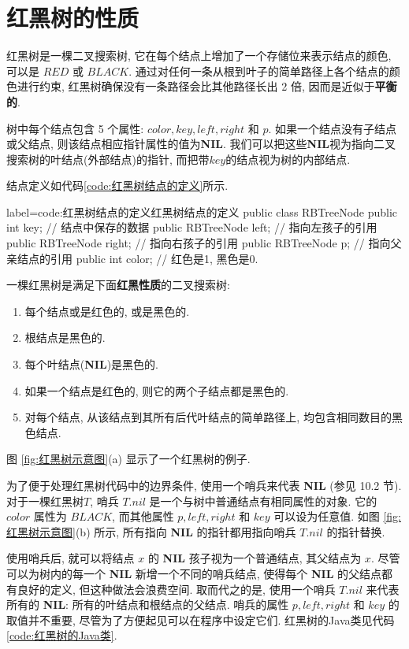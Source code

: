 \documentclass[oneside,10pt,fontset=none]{ctexbook}
\numberwithin{definition}{chapter}
\numberwithin{theorem}{chapter}
\numberwithin{lemma}{chapter}
\begin{document}
\section{红黑树的性质}\label{section:红黑树的性质}

红黑树是一棵二叉搜索树, 它在每个结点上增加了一个存储位来表示结点的颜色, 可以是 $RED$ 或 $BLACK$. 通过对任何一条从根到叶子的简单路径上各个结点的颜色进行约束, 红黑树确保没有一条路径会比其他路径长出 2 倍, 因而是近似于\textbf{平衡的}.

树中每个结点包含 5 个属性: $color, key, left, right$ 和 $p$. 如果一个结点没有子结点或父结点, 则该结点相应指针属性的值为\textbf{NIL}. 我们可以把这些\textbf{NIL}视为指向二叉搜索树的叶结点(外部结点)的指针, 而把带$key$的结点视为树的内部结点.

结点定义如代码\ref{code:红黑树结点的定义}所示.

\begin{myjava}{label={code:红黑树结点的定义}}{红黑树结点的定义}{}
public class RBTreeNode {
    public int key; // 结点中保存的数据
    public RBTreeNode left; // 指向左孩子的引用
    public RBTreeNode right; // 指向右孩子的引用
    public RBTreeNode p; // 指向父亲结点的引用
    public int color; // 红色是1, 黑色是0.
}
\end{myjava}

一棵红黑树是满足下面\textbf{红黑性质}的二叉搜索树:

\begin{enumerate}
    \item 每个结点或是红色的, 或是黑色的.
    \item 根结点是黑色的.
    \item 每个叶结点(\textbf{NIL})是黑色的.
    \item 如果一个结点是红色的, 则它的两个子结点都是黑色的.
    \item 对每个结点, 从该结点到其所有后代叶结点的简单路径上, 均包含相同数目的黑色结点.
\end{enumerate}

图 \ref{fig:红黑树示意图}(a) 显示了一个红黑树的例子.

为了便于处理红黑树代码中的边界条件, 使用一个哨兵来代表 \textbf{NIL} (参见 10.2 节). 对于一棵红黑树$T$, 哨兵 $T.nil$ 是一个与树中普通结点有相同属性的对象. 它的 $color$ 属性为 $BLACK$, 而其他属性 $p, left, right$ 和 $key$ 可以设为任意值. 如图 \ref{fig:红黑树示意图}(b) 所示, 所有指向 \textbf{NIL} 的指针都用指向哨兵 $T.nil$ 的指针替换.

使用哨兵后, 就可以将结点 $x$ 的 \textbf{NIL} 孩子视为一个普通结点, 其父结点为 $x$. 尽管可以为树内的每一个 \textbf{NIL} 新增一个不同的哨兵结点, 使得每个 \textbf{NIL} 的父结点都有良好的定义, 但这种做法会浪费空间. 取而代之的是, 使用一个哨兵 $T.nil$ 来代表所有的 \textbf{NIL}: 所有的叶结点和根结点的父结点. 哨兵的属性 $p, left, right$ 和 $key$ 的取值并不重要, 尽管为了方便起见可以在程序中设定它们. 红黑树的Java类见代码\ref{code:红黑树的Java类}.
\end{document}
